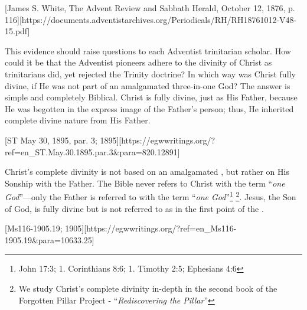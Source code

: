 [James S. White, The Advent Review and Sabbath Herald, October 12, 1876, p. 116][https://documents.adventistarchives.org/Periodicals/RH/RH18761012-V48-15.pdf]

This evidence should raise questions to each Adventist trinitarian scholar. How could it be that the Adventist pioneers adhere to the divinity of Christ as trinitarians did, yet rejected the Trinity doctrine? In which way was Christ fully divine, if He was not part of an amalgamated three-in-one God? The answer is simple and completely Biblical. Christ is fully divine, just as His Father, because He was begotten in the express image of the Father’s person; thus, He inherited complete divine nature from His Father.

[ST May 30, 1895, par. 3; 1895][https://egwwritings.org/?ref=en\_ST.May.30.1895.par.3&para=820.12891]

Christ's complete divinity is not based on an amalgamated , but rather on His Sonship with the Father. The Bible never refers to Christ with the term “\textit{one God}”—only the Father is referred to with the term “\textit{one God}”\footnote{John 17:3; 1. Corinthians 8:6; 1. Timothy 2:5; Ephesians 4:6} \footnote{We study Christ’s complete divinity in-depth  in the second book of the Forgotten Pillar Project - “\textit{Rediscovering the Pillar}”}. Jesus, the Son of God, is fully divine but is not referred to as  in the first point of the .

[Ms116-1905.19; 1905][https://egwwritings.org/?ref=en\_Ms116-1905.19&para=10633.25]

